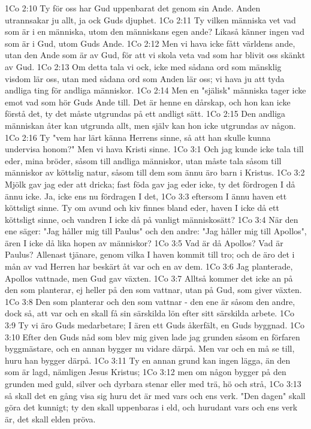 1Co 2:10  Ty för oss har Gud uppenbarat det genom sin Ande. Anden utrannsakar ju allt, ja ock Guds djuphet.
1Co 2:11  Ty vilken människa vet vad som är i en människa, utom den människans egen ande? Likaså känner ingen vad som är i Gud, utom Guds Ande.
1Co 2:12  Men vi hava icke fått världens ande, utan den Ande som är av Gud, för att vi skola veta vad som har blivit oss skänkt av Gud.
1Co 2:13  Om detta tala vi ock, icke med sådana ord som mänsklig visdom lär oss, utan med sådana ord som Anden lär oss; vi hava ju att tyda andliga ting för andliga människor.
1Co 2:14  Men en "själisk" människa tager icke emot vad som hör Guds Ande till. Det är henne en dårskap, och hon kan icke förstå det, ty det måste utgrundas på ett andligt sätt.
1Co 2:15  Den andliga människan åter kan utgrunda allt, men själv kan hon icke utgrundas av någon.
1Co 2:16  Ty "vem har lärt känna Herrens sinne, så att han skulle kunna undervisa honom?" Men vi hava Kristi sinne.
1Co 3:1  Och jag kunde icke tala till eder, mina bröder, såsom till andliga människor, utan måste tala såsom till människor av köttslig natur, såsom till dem som ännu äro barn i Kristus.
1Co 3:2  Mjölk gav jag eder att dricka; fast föda gav jag eder icke, ty det fördrogen I då ännu icke. Ja, icke ens nu fördragen I det,
1Co 3:3  eftersom I ännu haven ett köttsligt sinne. Ty om avund och kiv finnes bland eder, haven I icke då ett köttsligt sinne, och vandren I icke då på vanligt människosätt?
1Co 3:4  När den ene säger: "Jag håller mig till Paulus" och den andre: "Jag håller mig till Apollos", ären I icke då lika hopen av människor?
1Co 3:5  Vad är då Apollos? Vad är Paulus? Allenast tjänare, genom vilka I haven kommit till tro; och de äro det i mån av vad Herren har beskärt åt var och en av dem.
1Co 3:6  Jag planterade, Apollos vattnade, men Gud gav växten.
1Co 3:7  Alltså kommer det icke an på den som planterar, ej heller på den som vattnar, utan på Gud, som giver växten.
1Co 3:8  Den som planterar och den som vattnar - den ene är såsom den andre, dock så, att var och en skall få sin särskilda lön efter sitt särskilda arbete.
1Co 3:9  Ty vi äro Guds medarbetare; I ären ett Guds åkerfält, en Guds byggnad.
1Co 3:10  Efter den Guds nåd som blev mig given lade jag grunden såsom en förfaren byggmästare, och en annan bygger nu vidare därpå. Men var och en må se till, huru han bygger därpå.
1Co 3:11  Ty en annan grund kan ingen lägga, än den som är lagd, nämligen Jesus Kristus;
1Co 3:12  men om någon bygger på den grunden med guld, silver och dyrbara stenar eller med trä, hö och strå,
1Co 3:13  så skall det en gång visa sig huru det är med vars och ens verk. "Den dagen" skall göra det kunnigt; ty den skall uppenbaras i eld, och hurudant vars och ens verk är, det skall elden pröva.
